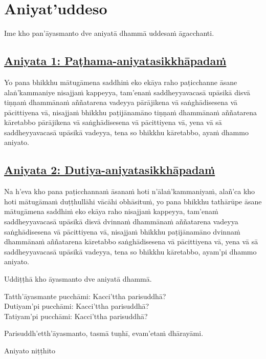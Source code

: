 \section{Aniyat'uddeso}
\label{aniy}

\begin{intro}
  Ime kho pan'āyasmanto dve aniyatā dhammā uddesaṁ āgacchanti.
\end{intro}

\subsection*{\hyperref[unc1]{Aniyata 1: Paṭhama-aniyatasikkhāpadaṁ}}
\label{aniy1}
Yo pana bhikkhu mātugāmena saddhiṁ eko ekāya raho paṭicchanne āsane alaṅ'kammaniye nisajjaṁ kappeyya, tam'enaṁ saddheyyavacasā upāsikā disvā tiṇṇaṁ dhammānaṁ aññatarena vadeyya pārājikena vā saṅghādisesena vā pācittiyena vā, nisajjaṁ bhikkhu paṭijānamāno tiṇṇaṁ dhammānaṁ aññatarena kāretabbo pārājikena vā saṅghādisesena vā pācittiyena vā, yena vā sā saddheyyavacasā upāsikā vadeyya, tena so bhikkhu kāretabbo, ayaṁ dhammo aniyato.

\subsection*{\hyperref[unc2]{Aniyata 2: Dutiya-aniyatasikkhāpadaṁ}}
\label{aniy2}
Na h'eva kho pana paṭicchannaṁ āsanaṁ hoti n'ālaṅ'kammaniyaṁ, alañ'ca kho hoti mātugāmaṁ duṭṭhullāhi vācāhi obhāsituṁ, yo pana bhikkhu tathārūpe āsane mātugāmena saddhiṁ eko ekāya raho nisajjaṁ kappeyya, tam'enaṁ saddheyyavacasā upāsikā disvā dvinnaṁ dhammānaṁ aññatarena vadeyya saṅghādisesena vā pācittiyena vā, nisajjaṁ bhikkhu paṭijānamāno dvinnaṁ dhammānaṁ aññatarena kāretabbo saṅghādisesena vā pācittiyena vā, yena vā sā saddheyyavacasā upāsikā vadeyya, tena so bhikkhu kāretabbo, ayam'pi dhammo aniyato.

\medskip

\begin{center}
Uddiṭṭhā kho āyasmanto dve aniyatā dhammā.

\smallskip

Tatth'āyasmante pucchāmi: Kacci'ttha parisuddhā?\\
Dutiyam'pi pucchāmi: Kacci'ttha parisuddhā?\\
Tatiyam'pi pucchāmi: Kacci'ttha parisuddhā?

\smallskip

Parisuddh'etth'āyasmanto, tasmā tuṇhī, evam'etaṁ dhārayāmi.
\end{center}

\begin{outro}
  Aniyato niṭṭhito
\end{outro}

\clearpage
